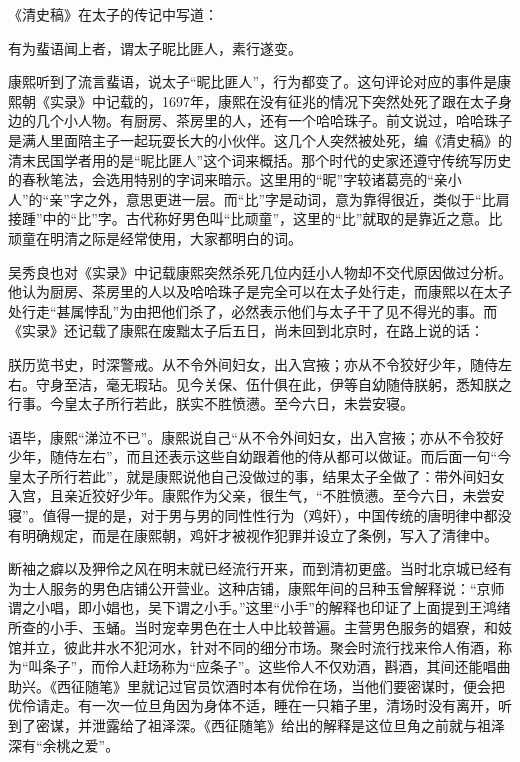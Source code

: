 
《清史稿》在太子的传记中写道：



\begin{bookquote}有为蜚语闻上者，谓太子昵比匪人，素行遂变。\end{bookquote}


康熙听到了流言蜚语，说太子“昵比匪人”，行为都变了。这句评论对应的事件是康熙朝《实录》中记载的，1697年，康熙在没有征兆的情况下突然处死了跟在太子身边的几个小人物。有厨房、茶房里的人，还有一个哈哈珠子。前文说过，哈哈珠子是满人里面陪主子一起玩耍长大的小伙伴。这几个人突然被处死，编《清史稿》的清末民国学者用的是“昵比匪人”这个词来概括。那个时代的史家还遵守传统写历史的春秋笔法，会选用特别的字词来暗示。这里用的“昵”字较诸葛亮的“亲小人”的“亲”字之外，意思更进一层。而“比”字是动词，意为靠得很近，类似于“比肩接踵”中的“比”字。古代称好男色叫“比顽童”，这里的“比”就取的是靠近之意。比顽童在明清之际是经常使用，大家都明白的词。



吴秀良也对《实录》中记载康熙突然杀死几位内廷小人物却不交代原因做过分析。他认为厨房、茶房里的人以及哈哈珠子是完全可以在太子处行走，而康熙以在太子处行走“甚属悖乱”为由把他们杀了，必然表示他们与太子干了见不得光的事。而《实录》还记载了康熙在废黜太子后五日，尚未回到北京时，在路上说的话：



\begin{bookquote}朕历览书史，时深警戒。从不令外间妇女，出入宫掖；亦从不令狡好少年，随侍左右。守身至洁，毫无瑕玷。见今关保、伍什俱在此，伊等自幼随侍朕躬，悉知朕之行事。今皇太子所行若此，朕实不胜愤懑。至今六日，未尝安寝。\end{bookquote}


语毕，康熙“涕泣不已”。康熙说自己“从不令外间妇女，出入宫掖；亦从不令狡好少年，随侍左右”，而且还表示这些自幼跟着他的侍从都可以做证。而后面一句“今皇太子所行若此”，就是康熙说他自己没做过的事，结果太子全做了：带外间妇女入宫，且亲近狡好少年。康熙作为父亲，很生气，“不胜愤懑。至今六日，未尝安寝”。值得一提的是，对于男与男的同性性行为（鸡奸），中国传统的唐明律中都没有明确规定，而是在康熙朝，鸡奸才被视作犯罪并设立了条例，写入了清律中。



断袖之癖以及狎伶之风在明末就已经流行开来，而到清初更盛。当时北京城已经有为士人服务的男色店铺公开营业。这种店铺，康熙年间的吕种玉曾解释说：“京师谓之小唱，即小娼也，吴下谓之小手。”这里“小手”的解释也印证了上面提到王鸿绪所查的小手、玉蛹。当时宠幸男色在士人中比较普遍。主营男色服务的娼寮，和妓馆并立，彼此井水不犯河水，针对不同的细分市场。聚会时流行找来伶人侑酒，称为“叫条子”，而伶人赶场称为“应条子”。这些伶人不仅劝酒，斟酒，其间还能唱曲助兴。《西征随笔》里就记过官员饮酒时本有优伶在场，当他们要密谋时，便会把优伶请走。有一次一位旦角因为身体不适，睡在一只箱子里，清场时没有离开，听到了密谋，并泄露给了祖泽深。《西征随笔》给出的解释是这位旦角之前就与祖泽深有“余桃之爱”。



